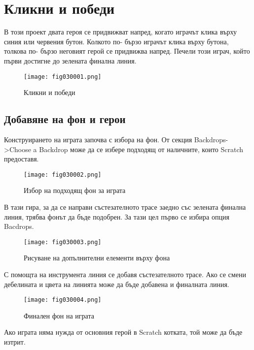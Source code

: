 \chapter{Кликни и победи}

В този проект двата героя се придвижват напред, когато играчът клика върху синия или червения бутон. Колкото по- бързо играчът клика върху бутона, толкова по- бързо неговият герой се придвижва напред. Печели този играч, който първи достигне до зелената финална линия.

\begin{figure}[H]
  \centering
  \texttt{[image: fig030001.png]}
  \caption{Кликни и победи}
\label{fig030001}
\end{figure}

\section{Добавяне на фон и герои}
Конструирането на играта започва с избора на фон. От секция Backdrops->Choose a Backdrop може да се избере подходящ от наличните, които Scratch предоставя.

\begin{figure}[H]
  \centering
  \texttt{[image: fig030002.png]}
  \caption{Избор на подходящ фон за играта}
\label{fig030002}
\end{figure}

В тази гира, за да се направи състезателното трасе заедно със зелената финална линия, трябва фонът да бъде подобрен. За тази цел първо се избира опция Bacdrops.

\begin{figure}[H]
  \centering
  \texttt{[image: fig030003.png]}
  \caption{Рисуване на допълнителни елементи върху фона}
\label{fig030003}
\end{figure}

С помощта на инструмента линия се добавя състезателното трасе. Ако се смени дебелината и цвета на линията може да бъде добавена и финалната линия.

\begin{figure}[H]
  \centering
  \texttt{[image: fig030004.png]}
  \caption{Финален фон на играта}
\label{fig030004}
\end{figure}

Ако играта няма нужда от основния герой в Scratch котката, той може да бъде изтрит.

